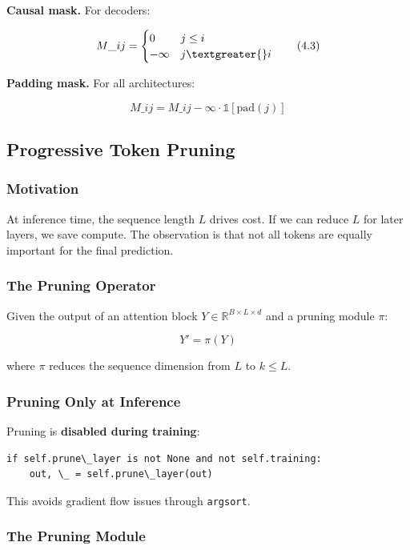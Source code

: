 \textbf{Causal mask.} For decoders:

\[
M\_{ij} = \begin{cases} 0 & j \leq i \\ -\infty & j \textgreater{} i \end{cases}
\tag{4.3}
\]

\textbf{Padding mask.} For all architectures:

\[
M\_{ij} = M\_{ij} - \infty \cdot \mathbb{1}[\text{pad}(j)]
\tag{4.4}
\]

\subsection{Progressive Token Pruning}

\subsubsection{Motivation}

At inference time, the sequence length $L$ drives cost. If we can reduce $L$ 
for later layers, we save compute. The observation is that not all tokens 
are equally important for the final prediction.

\subsubsection{The Pruning Operator}

Given the output of an attention block $Y \in \mathbb{R}^{B \times L \times d}$ 
and a pruning module $\pi$:

\[
Y' = \pi(Y)
\tag{4.5}
\]

where $\pi$ reduces the sequence dimension from $L$ to $k \leq L$.

\subsubsection{Pruning Only at Inference}

Pruning is \textbf{disabled during training}:

\begin{lstlisting}
if self.prune\_layer is not None and not self.training:
    out, \_ = self.prune\_layer(out)
\end{lstlisting}

This avoids gradient flow issues through \texttt{argsort}.

\subsubsection{The Pruning Module}

